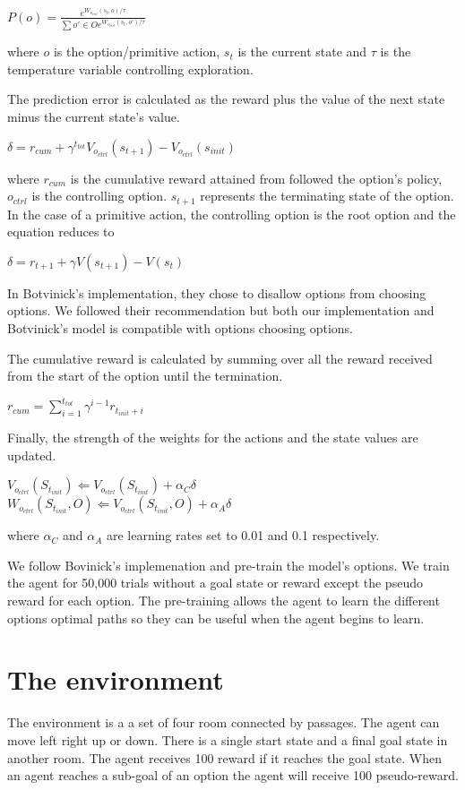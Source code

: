 $P(o) = \frac{ e^{W_{o_{ctrl}}(s_t,o)/\tau}}{\sum{o' \in O} e^{W_{o_{ctrl}}(s_t,o')/\tau}}$

where $o$ is the option/primitive action, $s_{t}$ is the current state and $\tau$ is the temperature variable controlling exploration. 

The prediction error is calculated as the reward plus the value of the next state minus the current state's value. 

$\delta = r_{cum} + \gamma^{t_{tot}}V_{o_{ctrl}}(s_{t+1}) - V_{o_{ctrl}}(s_{init})$

where $r_{cum}$ is the cumulative reward attained from followed the option's policy, $o_{ctrl}$ is the controlling option. $s_{t+1}$ represents the terminating state of the option. In the case of a primitive action, the controlling option is the root option and the equation reduces to 

$\delta = r_{t+1} + \gamma V(s_{t+1}) - V(s_{t})$

In Botvinick's implementation, they chose to disallow options from choosing options. We followed their recommendation but both our implementation and Botvinick's model is compatible with options choosing options.

The cumulative reward is calculated by summing over all the reward received from the start of the option until the termination.

$r_{cum} = \sum_{i=1}^{t_{tot}} \gamma^{i-1}r_{t_{init}+i}$

Finally, the strength of the weights for the actions and the state values are updated.

$V_{o_{ctrl}}(S_{t_{init}}) \Longleftarrow V_{o_{ctrl}}(S_{t_{init}}) + \alpha_{C}\delta$ \\
$W_{o_{ctrl}}(S_{t_{init}},O) \Longleftarrow V_{o_{ctrl}}(S_{t_{init}},O) + \alpha_{A}\delta$ 

where $\alpha_{C}$ and $\alpha_{A}$ are learning rates set to 0.01 and 0.1 respectively.

We follow Bovinick's implemenation and pre-train the model's options. We train the agent for 50,000 trials without a goal state or reward except the pseudo reward for each option. The pre-training allows the agent to learn the different options optimal paths so they can be useful when the agent begins to learn.

\section{The environment}
The environment is a a set of four room connected by passages. The agent can move left right up or down. There is a single start state and a final goal state in another room. The agent receives 100 reward if it reaches the goal state. When an agent reaches a sub-goal of an option the agent will receive 100 pseudo-reward.


